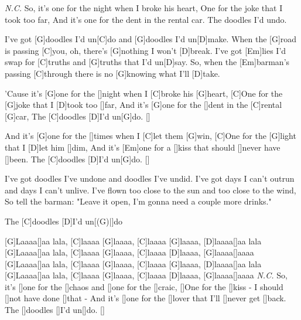 


\begin{guitar}
	 \footnotesize{\textit{N.C.}}
	So, it's one for the night when I broke his heart,
	One for the joke that I took too far,
	And it's one for the dent in the rental car. 
	The doodles I'd undo.
	
	I've got [G]doodles I'd un[C]do and [G]doodles I'd un[D]make.
	When the [G]road is passing [C]you, oh, there's [G]nothing I won't [D]break.
	I've got [Em]lies I'd swap for [C]truths and [G]truths that I'd un[D]say.
	So, when the [Em]barman's passing [C]through there is no [G]knowing what I'll [D]take.
	
	'Cause it's [G]one for the []night when I [C]broke his [G]heart,
	[C]One for the [G]joke that I [D]took too []far,
	And it's [G]one for the []dent in the [C]rental [G]car,
	The [C]doodles [D]I'd un[G]do. []{}
	
	And it's [G]one for the []times when I [C]let them [G]win,
	[C]One for the [G]light that I [D]let him []dim,
	And it's [Em]one for a []kiss that should []never have []been. 
	The [C]doodles [D]I'd un[G]do. []{}
	
	I've got doodles I've undone and doodles I've undid.
	I've got days I can't outrun and days I can't unlive.
	I've flown too close to the sun and too close to the wind,
	So tell the barman: "Leave it open, I'm gonna need a couple more drinks."
	
	 
	The [C]doodles [D]I'd un[(G)|]{do} 
	
	[G]Laaaa[]aa lala, [C]laaaa [G]laaaa, [C]laaaa [G]laaaa, [D]laaaa[]aa lala
	[G]Laaaa[]aa lala, [C]laaaa [G]laaaa, [C]laaaa [D]laaaa, [G]laaaa[]aaaa
	[G]Laaaa[]aa lala, [C]laaaa [G]laaaa, [C]laaaa [G]laaaa, [D]laaaa[]aa lala
	[G]Laaaa[]aa lala, [C]laaaa [G]laaaa, [C]laaaa [D]laaaa, [G]laaaa[]aaaa
	\pagebreak
	 \footnotesize{\textit{N.C.}}
	So, it's []one for the []chaos and []one for the []craic,
	[]One for the []kiss - I should []not have done []that -
	And it's []one for the []lover that I'll []never get []back. 
	The []doodles []I'd un[]do. []{}
	

\end{guitar}
